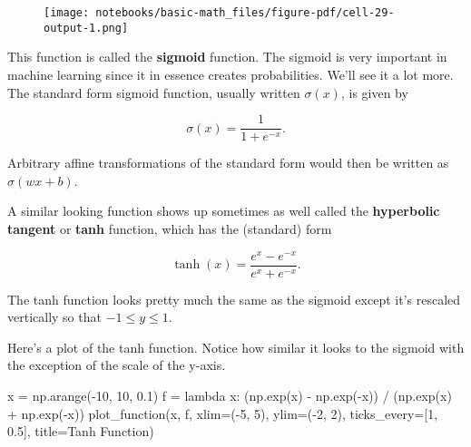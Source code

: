 \documentclass[
  letterpaper,
  DIV=11,
  numbers=noendperiod]{scrreprt}
\newenvironment{Shaded}{\begin{snugshade}}{\end{snugshade}}
\newcommand{\DecValTok}[1]{\textcolor[rgb]{0.68,0.00,0.00}{#1}}
\newcommand{\FloatTok}[1]{\textcolor[rgb]{0.68,0.00,0.00}{#1}}
\newcommand{\KeywordTok}[1]{\textcolor[rgb]{0.00,0.23,0.31}{#1}}
\newcommand{\NormalTok}[1]{\textcolor[rgb]{0.00,0.23,0.31}{#1}}
\newcommand{\OperatorTok}[1]{\textcolor[rgb]{0.37,0.37,0.37}{#1}}
\newcommand{\StringTok}[1]{\textcolor[rgb]{0.13,0.47,0.30}{#1}}
\begin{document}
\begin{figure}[H]

{\centering \texttt{[image: notebooks/basic-math\_files/figure-pdf/cell-29-output-1.png]}

}

\end{figure}

This function is called the \textbf{sigmoid} function. The sigmoid is
very important in machine learning since it in essence creates
probabilities. We'll see it a lot more. The standard form sigmoid
function, usually written \(\sigma(x)\), is given by

\[\sigma(x) = \frac{1}{1 + e^{-x}}.\]

Arbitrary affine transformations of the standard form would then be
written as \(\sigma(wx+b)\).

A similar looking function shows up sometimes as well called the
\textbf{hyperbolic tangent} or \textbf{tanh} function, which has the
(standard) form

\[\tanh(x) = \frac{e^x - e^{-x}}{e^x + e^{-x}}.\]

The tanh function looks pretty much the same as the sigmoid except it's
rescaled vertically so that \(-1 \leq y \leq 1\).

Here's a plot of the tanh function. Notice how similar it looks to the
sigmoid with the exception of the scale of the y-axis.

\begin{Shaded}
\begin{Highlighting}[]
\NormalTok{x }\OperatorTok{=}\NormalTok{ np.arange(}\OperatorTok{{-}}\DecValTok{10}\NormalTok{, }\DecValTok{10}\NormalTok{, }\FloatTok{0.1}\NormalTok{)}
\NormalTok{f }\OperatorTok{=} \KeywordTok{lambda}\NormalTok{ x: (np.exp(x) }\OperatorTok{{-}}\NormalTok{ np.exp(}\OperatorTok{{-}}\NormalTok{x)) }\OperatorTok{/}\NormalTok{ (np.exp(x) }\OperatorTok{+}\NormalTok{ np.exp(}\OperatorTok{{-}}\NormalTok{x))}
\NormalTok{plot\_function(x, f, xlim}\OperatorTok{=}\NormalTok{(}\OperatorTok{{-}}\DecValTok{5}\NormalTok{, }\DecValTok{5}\NormalTok{), ylim}\OperatorTok{=}\NormalTok{(}\OperatorTok{{-}}\DecValTok{2}\NormalTok{, }\DecValTok{2}\NormalTok{), ticks\_every}\OperatorTok{=}\NormalTok{[}\DecValTok{1}\NormalTok{, }\FloatTok{0.5}\NormalTok{], }
\NormalTok{              title}\OperatorTok{=}\StringTok{\textquotesingle{}Tanh Function\textquotesingle{}}\NormalTok{)}
\end{Highlighting}
\end{Shaded}
\end{document}
